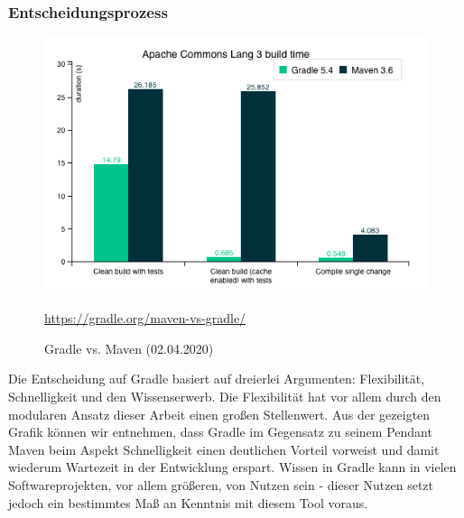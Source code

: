 \subsubsection{Entscheidungsprozess}
\begin{figure}[H]
\centering
  \includegraphics[scale=0.7]{images/gradle-vs-maven.png}
  \caption{Gradle vs. Maven (02.04.2020)}
  \url{https://gradle.org/maven-vs-gradle/}
\end{figure}
Die Entscheidung auf Gradle basiert auf dreierlei Argumenten: Flexibilität, Schnelligkeit und den Wissenserwerb. Die Flexibilität hat vor allem durch den modularen Ansatz dieser Arbeit einen großen Stellenwert. Aus der gezeigten Grafik können wir entnehmen, dass Gradle im Gegensatz zu seinem Pendant Maven beim Aspekt Schnelligkeit einen deutlichen Vorteil vorweist und damit wiederum Wartezeit in der Entwicklung erspart. Wissen in Gradle kann in vielen Softwareprojekten, vor allem größeren, von Nutzen sein - dieser Nutzen setzt jedoch ein bestimmtes Maß an Kenntnis mit diesem Tool voraus.


